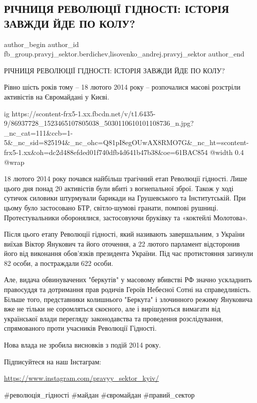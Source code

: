  
 
 
 
 
 
\subsection{РІЧНИЦЯ РЕВОЛЮЦІЇ ГІДНОСТІ: ІСТОРІЯ ЗАВЖДИ ЙДЕ ПО КОЛУ?}
\label{sec:18_02_2020.fb.fb_group.pravyj_sektor.berdichev.1.revgidnosti}
 
\ifcmt
 author_begin
   author_id fb_group.pravyj_sektor.berdichev,lisovenko_andrej.pravyj_sektor
 author_end
\fi

РІЧНИЦЯ РЕВОЛЮЦІЇ ГІДНОСТІ: ІСТОРІЯ ЗАВЖДИ ЙДЕ ПО КОЛУ?

Рівно шість років тому – 18 лютого 2014 року – розпочалися масові розстріли
активістів на Євромайдані у Києві.

\ifcmt
  ig https://scontent-frx5-1.xx.fbcdn.net/v/t1.6435-9/86937728_1523465107805038_5030110610101108736_n.jpg?_nc_cat=111&ccb=1-5&_nc_sid=825194&_nc_ohc=Q81pI8egOUwAX8RMO7G&_nc_ht=scontent-frx5-1.xx&oh=dc2d488efded01f740dfb4d641b47b38&oe=61BAC854
  @width 0.4
  @wrap 
\fi

18 лютого 2014 року почався найбільш трагічний етап Революції гідності. Лише
цього дня понад 20 активістів були вбиті з вогнепальної зброї. Також у ході
сутичок силовики штурмували барикади на Грушевського та Інститутській. При
цьому було застосовано БТР, світло-шумові гранати, помпові рушниці.
Протестувальники оборонялися, застосовуючи бруківку та «коктейлі Молотова». 

Після цього етапу Революції гідності, який називають завершальним, з України
виїхав Віктор Янукович та його оточення, а 22 лютого парламент відсторонив його
від виконання обов'язків президента України. Під час протистояння загинули 82
особи, а постраждали 622 особи.

Але, видача обвинувачених "беркутів" у масовому вбивстві РФ значно ускладнить
правосуддя та дотримання прав родичів Героїв Небесної Сотні на справедливість.
Більше того, представники колишнього "Беркута" і злочинного режиму Януковича
вже не тільки не соромляться скоєного, але і вирішуються вимагати від
української влади перегляду законодавства та проведення розслідування,
спрямованого проти учасників Революції Гідності. 

Нова влада не зробила висновків з подій 2014 року. 

Підписуйтеся на наш Інстаграм:

\url{https://www.instagram.com/pravyy_sektor_kyiv/}

\#революція\_гідності \#майдан \#євромайдан \#правий\_сектор
